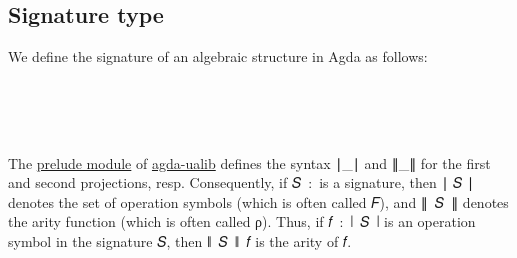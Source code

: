 \documentclass[sigplan,screen]{acmart}
\newcommand{\agdaualib}{\href{https://ualib.org}{agda-ualib}\xspace}
\newcommand\signatureOV{\AgdaFunction{Signature}\AgdaSpace{}\AgdaBound{𝓞}\AgdaSpace{}\AgdaBound{𝓥}}
\newcommand\preludemodule{\href{https://gitlab.com/ualib/ualib.gitlab.io/-/blob/master/prelude.lagda.rst}{prelude module}\xspace}
\begin{document}
\subsection{Signature type}
We define the signature of an algebraic structure in Agda as follows:
\begin{code}%
\>[0]\<%
\\
\>[0]\<%
\\
\>[0]\AgdaSpace{}%
\AgdaSymbol{:}\AgdaSpace{}%
\AgdaSymbol{(}\AgdaSpace{}%
\AgdaSpace{}%
\AgdaSymbol{:}\AgdaSpace{}%
\AgdaSymbol{)}\AgdaSpace{}%
\AgdaSpace{}%
\AgdaSpace{}%
\AgdaSpace{}%
\AgdaSpace{}%
\AgdaSpace{}%
\AgdaSpace{}%
\<%
\\
\>[0]\AgdaSpace{}%
\AgdaSpace{}%
\AgdaSpace{}%
\AgdaSymbol{=}\AgdaSpace{}%
\AgdaSpace{}%
\AgdaSpace{}%
\AgdaSpace{}%
\AgdaSpace{}%
%
\>[27]\AgdaFunction{,}\AgdaSpace{}%
\AgdaSymbol{(}\AgdaSpace{}%
\AgdaSpace{}%
\AgdaSpace{}%
\AgdaSpace{}%
\AgdaSpace{}%
\AgdaSymbol{)}\<%
\end{code}
The \preludemodule of \agdaualib defines the syntax ∣\_∣ and ∥\_∥ for the first and second projections, resp.  Consequently, if 𝑆~:~\signatureOV is a signature, then ∣ 𝑆 ∣ denotes the set of operation symbols (which is often called 𝐹), and ∥~𝑆~∥ denotes the arity function (which is often called ρ). Thus, if  𝑓~:~∣~𝑆~∣ is an operation symbol in the signature 𝑆, then ∥~𝑆~∥~𝑓 is the arity of 𝑓.
\end{document}
